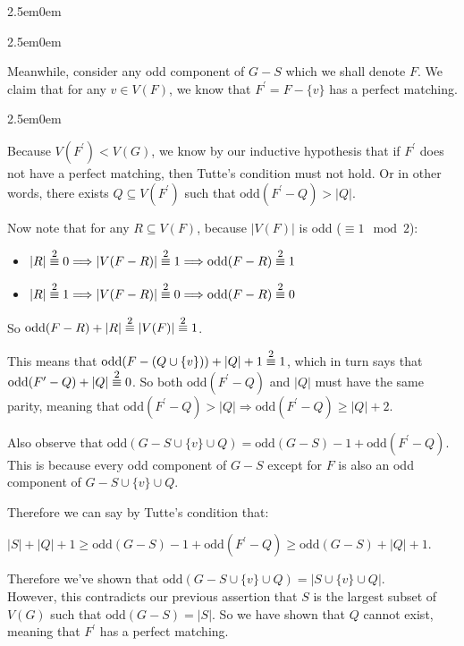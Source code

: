 \documentclass{book}
\newcommand{\hFour}{%
   \color{Cerulean}
   \fontsize{12}{14}\selectfont%
}
\newenvironment{myIndent}{%
   \begin{adjustwidth}{2.5em}{0em}%
}{%
   \end{adjustwidth}%
}
\newcommand{\oddComp}[1]{\mathrm{odd}(#1)}
\newcommand{\myequiv}[1]{\stackrel{\mathclap{\normalfont\mbox{\footnotesize#1}}}{\equiv}}
\newcommand{\retTwo}{\hfill\bigbreak}
\begin{document}
{\begin{myIndent}
\begin{myIndent}
      Meanwhile, consider any odd component of $G - S$ which we shall denote $F$. We claim that for any $v \in V(F)$, we know that $F^\prime = F - \{v\}$ has a perfect matching.
      {\begin{myIndent} \hFour
         Because $V(F^\prime) < V(G)$, we know by our inductive hypothesis that if $F^\prime$ does not have a perfect matching, then Tutte's condition must not hold. Or in other words, there exists $Q \subseteq V(F^\prime)$ such that $\oddComp{F^\prime - Q} > |Q|$. \retTwo

         Now note that for any $R \subseteq V(F)$, because $|V(F)|$ is odd ($\equiv 1 \mod{2}$):
         \begin{itemize}
            \item $|R| \myequiv{2} 0 \Longrightarrow |V(F - R)| \myequiv{2} 1 \Longrightarrow \oddComp{F - R} \myequiv{2} 1$
            \item  $|R| \myequiv{2} 1 \Longrightarrow |V(F - R)| \myequiv{2} 0 \Longrightarrow \oddComp{F - R} \myequiv{2} 0$
         \end{itemize}
         So $\oddComp{F - R} + |R| \myequiv{2} |V(F)| \myequiv{2} 1$. \retTwo

         This means that $\oddComp{F - (Q \cup \{v\})} + |Q| + 1 \myequiv{2} 1$, which in turn says that $\oddComp{F^\prime - Q} + |Q| \myequiv{2} 0$. So both $\oddComp{F^\prime - Q}$ and $|Q|$ must have the same parity, meaning that  $\oddComp{F^\prime - Q} > |Q| \Rightarrow \oddComp{F^\prime - Q} \geq |Q| + 2$. \retTwo

         Also observe that $\oddComp{G - S \cup \{v\} \cup Q} = \oddComp{G - S} - 1 + \oddComp{F^\prime - Q}$. This is because every odd component of $G - S$ except for $F$ is also an odd component of $G - S \cup \{v\} \cup Q$. \retTwo

         Therefore we can say by Tutte's condition that:

         {\center$ |S| + |Q| + 1 \geq  \oddComp{G - S} - 1 + \oddComp{F^\prime - Q} \geq \oddComp{G - S} + |Q| + 1$.\par}

         \newpage

         Therefore we've shown that $\oddComp{G - S \cup \{v\} \cup Q} = |S \cup \{v\} \cup Q|$.\\ However, this contradicts our previous assertion that $S$ is the largest subset of $V(G)$ such that $\oddComp{G - S} = |S|$. So we have shown that $Q$ cannot exist, meaning that $F^\prime$ has a perfect matching. \retTwo
      \end{myIndent}}


\end{myIndent}
\end{myIndent}}
\end{document}
